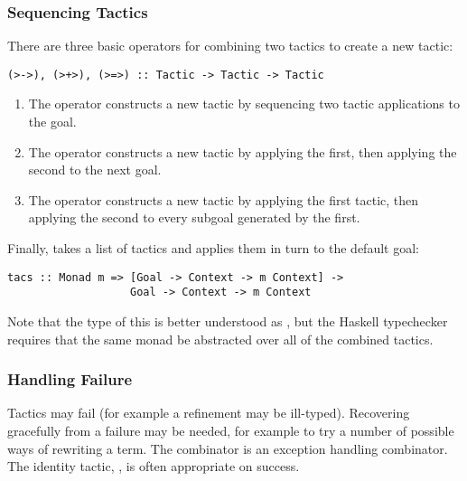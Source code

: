 \subsubsection{Sequencing Tactics}
There are three basic operators for combining two tactics to create a
new tactic:

\begin{verbatim}
(>->), (>+>), (>=>) :: Tactic -> Tactic -> Tactic
\end{verbatim}

\begin{enumerate}
\item The \hdecl{>->} operator constructs a new tactic by sequencing two
tactic applications to the  goal.

\item The \hdecl{>+>} operator constructs a new tactic by applying the
  first, then applying the second to the next  goal.

\item The \hdecl{>=>} operator constructs a new tactic by applying the first
tactic, then applying the second to every subgoal generated by the first.

\end{enumerate}

\noindent
Finally,  takes a list of tactics and applies
them in turn to the default goal:

\begin{verbatim}
tacs :: Monad m => [Goal -> Context -> m Context] ->
                   Goal -> Context -> m Context
\end{verbatim}

Note that the type of this is better understood as , but the Haskell typechecker requires that the same monad be
abstracted over all of the combined tactics.

\subsubsection{Handling Failure}
Tactics may fail (for example a refinement may be ill-typed).
Recovering gracefully from a failure may be needed, for
example to try a number of possible ways of rewriting a term.
The  combinator is an exception handling combinator.
The identity tactic, , is often appropriate on success.


